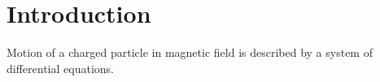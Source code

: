 \section{Introduction}
Motion of a charged particle in magnetic field is described by a system of differential equations.


